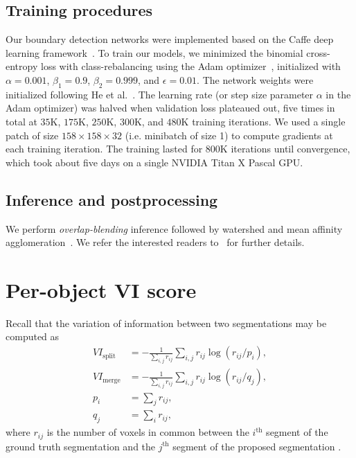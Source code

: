 \documentclass{article}
\begin{document}
\begin{appendices}
\subsection{Training procedures}
Our boundary detection networks were implemented based on the Caffe deep
learning framework~\cite{jia2014caffe}. To train our models, we minimized the
binomial cross-entropy loss with class-rebalancing using the Adam
optimizer~\cite{adam}, initialized with $\alpha=0.001$, $\beta_1=0.9$,
$\beta_2=0.999$, and $\epsilon=0.01$. The network weights were initialized
following He et al.~\cite{he2015delving}. The learning rate (or step size
parameter $\alpha$ in the Adam optimizer) was halved when validation loss
plateaued out, five times in total at $35$K, $175$K, $250$K, $300$K, and
$480$K training iterations. We used a single patch of size
$158\times158\times32$ (i.e. minibatch of size 1) to compute gradients at each
training iteration. The training lasted for $800$K iterations until convergence,
which took about five days on a single NVIDIA Titan X Pascal GPU.

\subsection{Inference and postprocessing}
We perform \emph{overlap-blending} inference followed by watershed and mean affinity agglomeration~\cite{kisuk}. We refer the interested readers to~\cite{kisuk} for further details.

\section{Per-object VI score}
\label{appendix:vi}
 Recall that the variation of information between two segmentations may be computed as
\begin{align*}
	VI_\text{split}&=-\frac 1 {\sum_{i,j} r_{ij}} \sum_{i,j} r_{ij} \log(r_{ij}/p_i),\\
	VI_\text{merge}&=-\frac 1 {\sum_{i,j} r_{ij}} \sum_{i,j} r_{ij} \log(r_{ij}/q_j),\\
	p_i&=\sum_j r_{ij},\\
	q_j&=\sum_i r_{ij},
\end{align*}
where $r_{ij}$ is the number of voxels in common between the $i^\text{th}$ segment of the ground truth segmentation and the $j^\text{th}$ segment of the proposed segmentation \cite{vi}.


\end{appendices}
\end{document}
